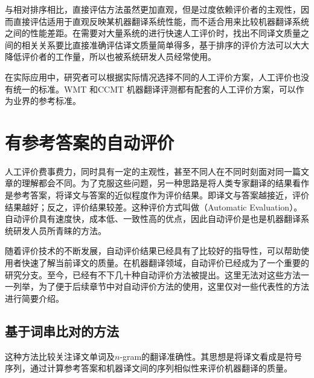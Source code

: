\parinterval 与相对排序相比，直接评估方法虽然更加直观，但是过度依赖评价者的主观性，因而直接评估适用于直观反映某机器翻译系统性能，而不适合用来比较机器翻译系统之间的性能差距。在需要对大量系统的进行快速人工评价时，找出不同译文质量之间的相关关系要比直接准确评估译文质量简单得多，基于排序的评价方法可以大大降低评价者的工作量，所以也被系统研发人员经常使用。

\parinterval 在实际应用中，研究者可以根据实际情况选择不同的人工评价方案，人工评价也没有统一的标准。WMT 和CCMT 机器翻译评测都有配套的人工评价方案，可以作为业界的参考标准。

\sectionnewpage
\section{有参考答案的自动评价}\label{Automatic evaluation with reference answers}

\parinterval 人工评价费事费力，同时具有一定的主观性，甚至不同人在不同时刻面对同一篇文章的理解都会不同。为了克服这些问题，另一种思路是将人类专家翻译的结果看作是参考答案，将译文与答案的近似程度作为评价结果。即译文与答案越接近，评价结果越好；反之，评价结果较差。这种评价方式叫做{\small{}}（Automatic Evaluation）。自动评价具有速度快，成本低、一致性高的优点，因此自动评价是也是机器翻译系统研发人员所青睐的方法。

\parinterval 随着评价技术的不断发展，自动评价结果已经具有了比较好的指导性，可以帮助使用者快速了解当前译文的质量。在机器翻译领域，自动评价已经成为了一个重要的研究分支。至今，已经有不下几十种自动评价方法被提出。这里无法对这些方法一一列举，为了便于后续章节中对自动评价方法的使用，这里仅对一些代表性的方法进行简要介绍。


\subsection{基于词串比对的方法}

\parinterval 这种方法比较关注译文单词及$n$-gram的翻译准确性。其思想是将译文看成是符号序列，通过计算参考答案和机器译文间的序列相似性来评价机器翻译的质量。


